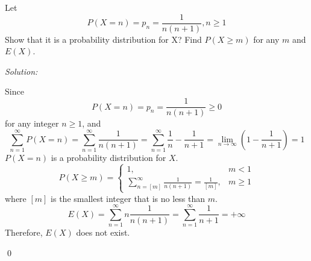 \documentclass[12pt]{article}
\newenvironment{problem}[2][Problem]{\begin{trivlist}
\item[\hskip \labelsep {\bfseries #1}\hskip \labelsep {\bfseries #2.}]}{\end{trivlist}}
\newenvironment{sol}
    {\emph{Solution:}
    }
    {
    \qed
    }
\begin{document}
\begin{problem}{10}
Let
$$P(X = n) = p_{n} = \frac{1}{n(n+1)}, n \geq 1$$
Show that it is a probability distribution for X? Find $P(X \geq m)$ for any $m$ and $E(X)$.
\end{problem}
\begin{sol}
Since
\[
P(X=n)=p_n=\frac{1}{n(n+1)}\geq0
\]
for any integer $n\geq1$, and
\[
\sum_{n=1}^{\infty}P(X=n)=\sum_{n=1}^{\infty}\frac{1}{n(n+1)}=\sum_{n=1}^{\infty}\frac{1}{n}-\frac{1}{n+1}=\lim_{n\to\infty}(1-\frac{1}{n+1})=1
\]
$P(X=n)$ is a probability distribution for $X$.
\large
\[
P(X\geq m)=\left\{\begin{array}{ll}
1,&m<1\\
\sum_{n=[m]}^{\infty}\frac{1}{n(n+1)}=\frac{1}{[m]},&m\geq1
\end{array}\right.
\]
\normalsize
where $[m]$ is the smallest integer that is no less than $m$.
\[
E(X)=\sum_{n=1}^{\infty}n\frac{1}{n(n+1)}=\sum_{n=1}^{\infty}\frac{1}{n+1}=+\infty
\]
Therefore, $E(X)$ does not exist.
\end{sol}















































































\end{document}
